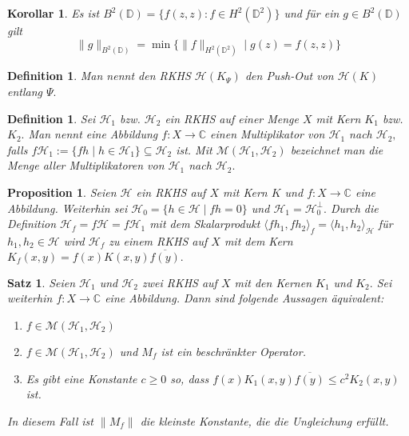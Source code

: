 \documentclass[12pt,titlepage,twoside,cleardoublepage]{article}
\theoremstyle{nummermitklammern}
\newtheorem{korollar}[temp]{Korollar}
\newtheorem{definition}[temp]{Definition}
\newtheorem{satz}[temp]{Satz}
\newtheorem{definition}[zahl]{Definition}
\newtheorem{satz}[zahl]{Satz}
\numberwithin{equation}{section}
\newtheorem{korollar}[zahl]{Korollar}
\newtheorem{proposition}[zahl]{Proposition}
\begin{document}
\begin{korollar}
Es ist $B^2(\mathbb{D})=\{f(z,z):f\in H^2(\mathbb{D}^2)\}$ und für ein $g \in B^2(\mathbb{D})$ gilt 
\[
\|g\|_{B^2(\mathbb{D})}= \min\{\|f\|_{H^2(\mathbb{D}^2)}\mid g(z)=f(z,z)\}
\]
\end{korollar}

\begin{definition}
Man nennt den RKHS $\mathcal{H}(K_{\Psi})$ den \emph{Push-Out} von $\mathcal{H}(K)$ entlang $\Psi.$ 
\end{definition}

\begin{definition}
Sei $\mathcal{H}_1$ bzw. $\mathcal{H}_2$ ein RKHS  auf einer Menge $X$ mit Kern $K_1$ bzw. $K_2.$ Man nennt eine Abbildung $f:X\to \mathbb{C}$ einen \emph{Multiplikator} von $\mathcal{H}_1$ nach $\mathcal{H}_2,$ falls $f\mathcal{H}_1:=\{fh\mid h\in \mathcal{H}_1\}\subseteq \mathcal{H}_2$ ist. Mit $\mathcal{M}(\mathcal{H}_1,\mathcal{H}_2)$ bezeichnet man die Menge aller Multiplikatoren von $\mathcal{H}_1$ nach $\mathcal{H}_2.$
 \end{definition}

\begin{proposition}
Seien $\mathcal{H}$ ein RKHS auf $X$ mit Kern $K$ und $f:X\to \mathbb{C}$ eine Abbildung.
 Weiterhin sei $\mathcal{H}_0=\{h\in \mathcal{H}\mid fh=0\}$ und $\mathcal{H}_1=\mathcal{H}_0^{\bot}.$ Durch die Definition $\mathcal{H}_f=f\mathcal{H}=f\mathcal{H}_1$ mit dem Skalarprodukt $\langle fh_1,fh_2\rangle_f=\langle h_1,h_2 \rangle_{\mathcal{H}}$ für $h_1,h_2\in \mathcal{H}$ wird $\mathcal{H}_f$ zu einem RKHS auf $X$ mit dem Kern $K_f(x,y)=f(x)K(x,y)\overline{ f(y) }.$

\end{proposition}

\begin{satz}
Seien $\mathcal{H}_1$ und $\mathcal{H}_2$ zwei RKHS auf $X$ mit den Kernen $K_1$ und $K_2.$ Sei weiterhin $f:X\to  \mathbb{C}$ eine Abbildung. Dann sind folgende Aussagen äquivalent:
\begin{enumerate}
\item $f\in \mathcal{M}(\mathcal{H}_1,\mathcal{H}_2)$
\item  $f\in \mathcal{M}(\mathcal{H}_1,\mathcal{H}_2)$ und $M_f$ ist ein beschränkter Operator.
\item Es gibt eine Konstante $c\geq 0 $ so, dass $f(x)K_1(x,y)\overline{f(y)} \leq c^2 K_2(x,y)$ ist.
\end{enumerate}
In diesem Fall ist $\|M_f\|$ die kleinste Konstante, die die Ungleichung erfüllt.
\end{satz}
\end{document}
